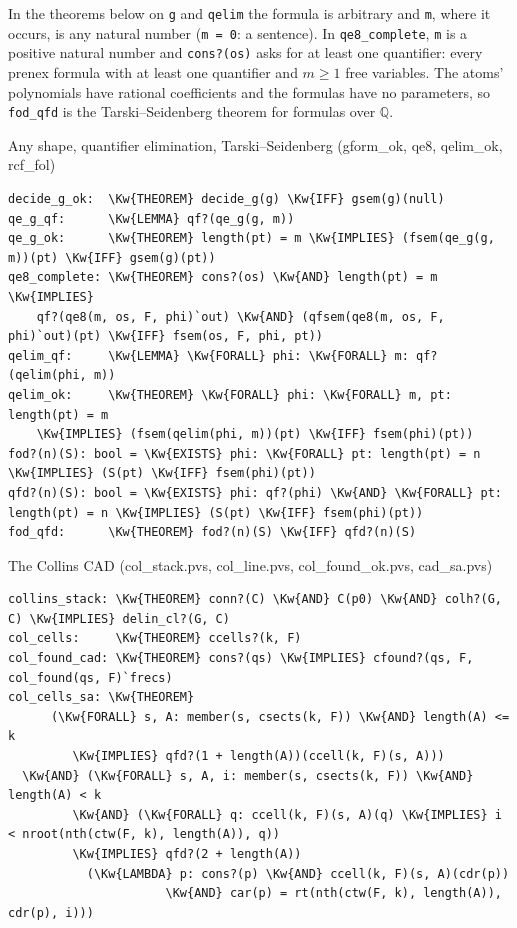 \documentclass[11pt]{article}
\newcommand\Kw[1]{\textcolor{accent}{\textbf{#1}}}
\newcommand\Cm[1]{\textcolor{muted}{#1}}
\begin{document}
In the theorems below on \texttt{g} and \texttt{qelim} the formula is arbitrary and \texttt{m}, where it occurs, is any
natural number (\texttt{m = 0}: a sentence). In \texttt{qe8\_complete}, \texttt{m} is a positive natural number and \texttt{cons?(os)}
asks for at least one quantifier: every prenex formula with at least one quantifier and $m \ge 1$ free variables. The atoms'
polynomials have rational coefficients and the formulas have no parameters, so \texttt{fod\_qfd} is the
Tarski--Seidenberg theorem for formulas over $\mathbb{Q}$.

\begin{thmbox}{Any shape, quantifier elimination, Tarski--Seidenberg \Cm{\normalfont(gform\_ok, qe8, qelim\_ok, rcf\_fol)}}
\begin{Verbatim}[fontsize=\footnotesize]
decide_g_ok:  \Kw{THEOREM} decide_g(g) \Kw{IFF} gsem(g)(null)
qe_g_qf:      \Kw{LEMMA} qf?(qe_g(g, m))
qe_g_ok:      \Kw{THEOREM} length(pt) = m \Kw{IMPLIES} (fsem(qe_g(g, m))(pt) \Kw{IFF} gsem(g)(pt))
qe8_complete: \Kw{THEOREM} cons?(os) \Kw{AND} length(pt) = m \Kw{IMPLIES}
    qf?(qe8(m, os, F, phi)`out) \Kw{AND} (qfsem(qe8(m, os, F, phi)`out)(pt) \Kw{IFF} fsem(os, F, phi, pt))
qelim_qf:     \Kw{LEMMA} \Kw{FORALL} phi: \Kw{FORALL} m: qf?(qelim(phi, m))
qelim_ok:     \Kw{THEOREM} \Kw{FORALL} phi: \Kw{FORALL} m, pt: length(pt) = m
    \Kw{IMPLIES} (fsem(qelim(phi, m))(pt) \Kw{IFF} fsem(phi)(pt))
fod?(n)(S): bool = \Kw{EXISTS} phi: \Kw{FORALL} pt: length(pt) = n \Kw{IMPLIES} (S(pt) \Kw{IFF} fsem(phi)(pt))
qfd?(n)(S): bool = \Kw{EXISTS} phi: qf?(phi) \Kw{AND} \Kw{FORALL} pt: length(pt) = n \Kw{IMPLIES} (S(pt) \Kw{IFF} fsem(phi)(pt))
fod_qfd:      \Kw{THEOREM} fod?(n)(S) \Kw{IFF} qfd?(n)(S)
\end{Verbatim}
\end{thmbox}

\begin{thmbox}{The Collins CAD \Cm{\normalfont(col\_stack.pvs, col\_line.pvs, col\_found\_ok.pvs, cad\_sa.pvs)}}
\begin{Verbatim}[fontsize=\footnotesize]
collins_stack: \Kw{THEOREM} conn?(C) \Kw{AND} C(p0) \Kw{AND} colh?(G, C) \Kw{IMPLIES} delin_cl?(G, C)
col_cells:     \Kw{THEOREM} ccells?(k, F)
col_found_cad: \Kw{THEOREM} cons?(qs) \Kw{IMPLIES} cfound?(qs, F, col_found(qs, F)`frecs)
col_cells_sa: \Kw{THEOREM}
      (\Kw{FORALL} s, A: member(s, csects(k, F)) \Kw{AND} length(A) <= k
         \Kw{IMPLIES} qfd?(1 + length(A))(ccell(k, F)(s, A)))
  \Kw{AND} (\Kw{FORALL} s, A, i: member(s, csects(k, F)) \Kw{AND} length(A) < k
         \Kw{AND} (\Kw{FORALL} q: ccell(k, F)(s, A)(q) \Kw{IMPLIES} i < nroot(nth(ctw(F, k), length(A)), q))
         \Kw{IMPLIES} qfd?(2 + length(A))
           (\Kw{LAMBDA} p: cons?(p) \Kw{AND} ccell(k, F)(s, A)(cdr(p))
                      \Kw{AND} car(p) = rt(nth(ctw(F, k), length(A)), cdr(p), i)))
\end{Verbatim}
\end{thmbox}
\end{document}
